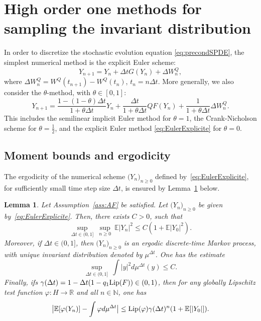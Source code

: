 \documentclass[11pt]{amsart}
\newcommand{\E}{\mathbb{E}}
\newcommand{\R}{\mathbb{R}}
\newcommand{\N}{\mathbb{N}}
\newtheorem{lemma}[theo]{Lemma}
\begin{document}
\section{High order one methods for sampling the invariant distribution}
\label{section:simple_CV_analysis}

In order to discretize the stochastic evolution equation \eqref{eq:precondSPDE}, the simplest numerical method is the explicit Euler scheme:
\begin{equation}\label{eq:EulerExplicite}
Y_{n+1}=Y_n+\Delta tG(Y_n)+\Delta W_n^Q,
\end{equation}
where $\Delta W_n^Q=W^Q(t_{n+1})-W^Q(t_n)$, $t_n=n\Delta t$.
%
More generally, we also consider the $\theta$-method, with $\theta\in[0,1]$:
\begin{equation}\label{eq:thetascheme}
Y_{n+1}=\frac{1-(1-\theta)\Delta t}{1+\theta \Delta t}Y_n+\frac{\Delta t}{1+\theta\Delta t}QF(Y_n)+\frac{1}{1+\theta\Delta t}\Delta W_n^Q.
\end{equation}
This includes the semilinear implicit Euler method for $\theta=1$, the Crank-Nicholson scheme for $\theta=\frac12$, and the explicit Euler method \eqref{eq:EulerExplicite} for $\theta=0$.






\subsection{Moment bounds and ergodicity}

The ergodicity of the numerical scheme $\bigl(Y_n\bigr)_{n\ge 0}$ defined by~\eqref{eq:EulerExplicite}, for sufficiently small time step size $\Delta t$, is ensured by Lemma~\ref{lem:ergoYn} below.
%
\begin{lemma}\label{lem:ergoYn}
Let Assumption~\ref{ass:AF} be satisfied.
%
Let $\bigl(Y_n\bigr)_{n\ge 0}$ be given by~\eqref{eq:EulerExplicite}.
Then, there exists $C>0$, such that
\begin{equation}\label{eq:moment-num-Euler}
\underset{\Delta t\in(0,1]}\sup~\underset{n\ge 0}\sup~\E|Y_n|^2\le C(1+\E|Y_0|^2).
\end{equation}
Moreover, if $\Delta t\in(0,1]$, then $\bigl(Y_n\bigr)_{n\ge 0}$ is an ergodic discrete-time Markov process, with unique invariant distribution denoted by $\mu^{\Delta t}$. One has the estimate
\[
\underset{\Delta t\in(0,1]}\sup~\int |y|^2 d\mu^{\Delta t}(y)\le C.
\]
Finally, ifs $\gamma(\Delta t)=1-\Delta t(1-q_1{\rm Lip}(F))\in(0,1)$, then for any globally Lipschitz test function $\varphi:H\to\R$ and all $n\in\N$, one has
\[
\big|\E[\varphi(Y_n)]-\int\varphi d\mu^{\Delta t} \big|\le {\rm Lip}(\varphi)\gamma(\Delta t)^n(1+\E[|Y_0|]).
\]
\end{lemma}
\end{document}
